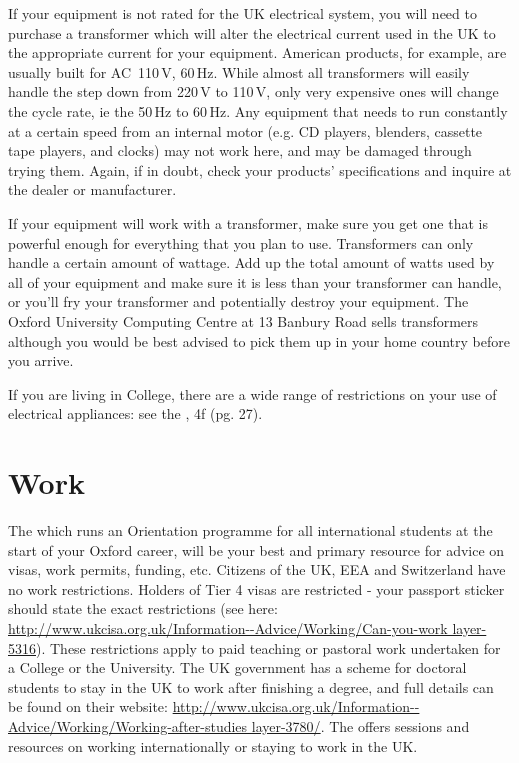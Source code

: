 If your equipment is not rated for the UK electrical system, you will need to
purchase a transformer which will alter the electrical current used in the UK to
the appropriate current for your equipment. American products, for example, are
usually built for AC~110\,V, 60\,Hz. While almost all transformers will easily
handle the step down from 220\,V to 110\,V, only very expensive ones will change
the cycle rate, ie the 50\,Hz to 60\,Hz. Any equipment that needs to run
constantly at a certain speed from an internal motor (e.g. CD players, blenders, cassette tape players, and clocks) may not work here, and may be damaged through trying them. Again, if in doubt, check your products' specifications and inquire at the dealer or manufacturer.

If your equipment will work with a transformer, make sure you get one that is powerful enough for everything that you plan to use. Transformers can only handle a certain amount of wattage. Add up the total amount of watts used by all of your equipment and make sure it is less than your transformer can handle, or you'll fry your transformer and potentially destroy your equipment. The Oxford University Computing Centre at 13 Banbury Road sells transformers although you would be best advised to pick them up in your home country before you arrive.

If you are living in College, there are a wide range of restrictions on your use
of electrical appliances: see the
\href{http://www.new.ox.ac.uk/sites/default/files/sites/all/files/HB_Web version_100915.pdf}{}, 4f (pg. 27).

\section{Work} 
The \href{http://www.ox.ac.uk/about/international-oxford}{} which runs an Orientation programme for all international students at the start of your Oxford career, will be your best and primary resource for advice on visas, work permits, funding, etc.
Citizens of the UK, EEA and Switzerland have no work restrictions. Holders of
Tier 4 visas are restricted - your passport sticker should state the exact
restrictions (see here:
\url{http://www.ukcisa.org.uk/Information--Advice/Working/Can-you-work layer-5316}). These restrictions apply to paid teaching or pastoral work undertaken for a College or the University.
The UK government has a scheme for doctoral students to stay in the UK to work
after finishing a degree, and full details can be found on their website:
\url{http://www.ukcisa.org.uk/Information--Advice/Working/Working-after-studies layer-3780/}.
The \href{http://www.careers.ox.ac.uk/}{} offers sessions and resources on working internationally or staying to work in the UK.

